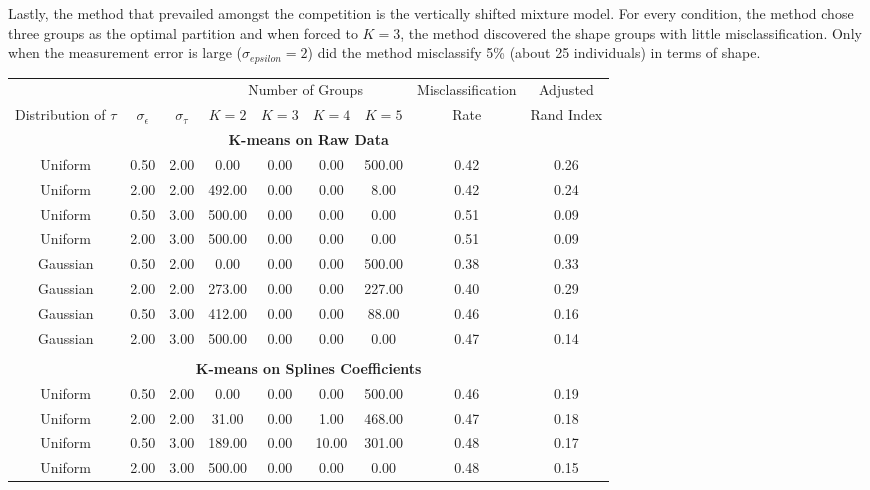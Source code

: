 \documentclass[12pt]{article}
\begin{document}
Lastly, the method that prevailed amongst the competition is the vertically shifted mixture model. For every condition, the method chose three groups as the optimal partition and when forced to $K=3$, the method discovered the shape groups with little misclassification. Only when the measurement error is large ($\sigma_{epsilon}=2$) did the method misclassify 5\% (about 25 individuals) in terms of shape. \\ 

\begin{table}[ht]
\begin{center}
\begin{tabular}{ccc|cccccc}
  \hline &&&\multicolumn{4}{c}{Number of Groups}&Misclassification&Adjusted\\ Distribution of $\tau$&$\sigma_{\epsilon}$&$\sigma_{\tau}$&$K=2$&$K=3$&$K=4$&$K=5$&Rate&Rand Index\\ \hline\multicolumn{9}{c}{\textbf{K-means on Raw Data}}\\ Uniform & 0.50 & 2.00 & 0.00 & 0.00 & 0.00 & 500.00 & 0.42 & 0.26 \\ 
  Uniform & 2.00 & 2.00 & 492.00 & 0.00 & 0.00 & 8.00 & 0.42 & 0.24 \\ 
  Uniform & 0.50 & 3.00 & 500.00 & 0.00 & 0.00 & 0.00 & 0.51 & 0.09 \\ 
  Uniform & 2.00 & 3.00 & 500.00 & 0.00 & 0.00 & 0.00 & 0.51 & 0.09 \\ 
  Gaussian & 0.50 & 2.00 & 0.00 & 0.00 & 0.00 & 500.00 & 0.38 & 0.33 \\ 
  Gaussian & 2.00 & 2.00 & 273.00 & 0.00 & 0.00 & 227.00 & 0.40 & 0.29 \\ 
  Gaussian & 0.50 & 3.00 & 412.00 & 0.00 & 0.00 & 88.00 & 0.46 & 0.16 \\ 
  Gaussian & 2.00 & 3.00 & 500.00 & 0.00 & 0.00 & 0.00 & 0.47 & 0.14 \\ 
   \\ \multicolumn{9}{c}{\textbf{K-means on Splines Coefficients}}\\Uniform & 0.50 & 2.00 & 0.00 & 0.00 & 0.00 & 500.00 & 0.46 & 0.19 \\ 
  Uniform & 2.00 & 2.00 & 31.00 & 0.00 & 1.00 & 468.00 & 0.47 & 0.18 \\ 
  Uniform & 0.50 & 3.00 & 189.00 & 0.00 & 10.00 & 301.00 & 0.48 & 0.17 \\ 
  Uniform & 2.00 & 3.00 & 500.00 & 0.00 & 0.00 & 0.00 & 0.48 & 0.15 \\ 

\end{tabular}
\end{center}
\end{table}
\end{document}
